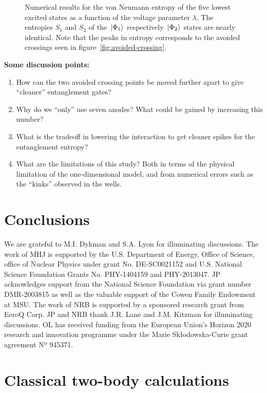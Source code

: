 \documentclass[twocolumn,superscriptaddress,unsortedaddress,
 amsmath,amssymb,
 aps,
]{revtex4-2}
\begin{document}
    \begin{figure}
        
        \caption{\label{fig:entropies} Numerical results for the von Neumann entropy of the five lowest excited states as a function of the voltage parameter $\lambda$. The entropies $S_1$ and $S_2$ of the $\ket*{\Phi_1}$ respectively $\ket*{\Phi_2}$ states are nearly identical. Note that the peaks in entropy corresponds to the avoided crossings seen in figure~\ref{fig:avoided-crossing}. %
        }
    \end{figure}


    \textbf{Some discussion points:}
    \begin{enumerate}
        \item How can the two avoided crossing points be moved further apart to give
            ``cleaner'' entanglement gates?
        \item Why do we ``only'' use seven anodes? What could be gained by
            increasing this number?
        \item What is the tradeoff in lowering the interaction to get cleaner spikes
            for the entanglement entropy?
        \item What are the limitations of this study?
            Both in terms of the physical limitation of the one-dimensional model,
            and from numerical errors such as the ``kinks'' observed in the wells.
    \end{enumerate}

\section{Conclusions} %


\begin{acknowledgments}
We are grateful to M.I. Dykman and S.A. Lyon for illuminating discussions. The work of MHJ is supported by the U.S. Department of Energy, Office of Science, office of Nuclear Physics under grant No. DE-SC0021152 and U.S. National Science Foundation Grants No. PHY-1404159 and PHY-2013047. JP acknowledges support from the National Science Foundation via grant number DMR-2003815 as well as the valuable support of the Cowen Family Endowment at MSU. The work of NRB is supported by a sponsored research grant from EeroQ Corp. JP and NRB thank J.R. Lane and J.M. Kitzman for illuminating discussions. OL has received funding from the European Union's Horizon 2020 research and innovation programme under the Marie Skłodowska-Curie grant agreement Nº 945371.
\end{acknowledgments}


\appendix
\section{Classical two-body calculations}


\end{document}
